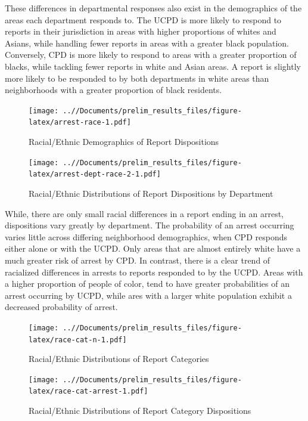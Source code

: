 \documentclass{ucetd}
\begin{document}
These differences in departmental responses also exist in the
demographics of the areas each department responds to. The UCPD is more
likely to respond to reports in their jurisdiction in areas with higher
proportions of whites and Asians, while handling fewer reports in areas
with a greater black population. Conversely, CPD is more likely to
respond to areas with a greater proportion of blacks, while tackling
fewer reports in white and Asian areas. A report is slightly more likely
to be responded to by both departments in white areas than neighborhoods
with a greater proportion of black residents.

\begin{figure}
\centering
\texttt{[image: ..//Documents/prelim\_results\_files/figure-latex/arrest-race-1.pdf]}
\caption{Racial/Ethnic Demographics of Report Dispositions}
\end{figure}

\begin{figure}
\centering
\texttt{[image: ..//Documents/prelim\_results\_files/figure-latex/arrest-dept-race-2-1.pdf]}
\caption{Racial/Ethnic Distributions of Report Dispositions by
Department}
\end{figure}

While, there are only small racial differences in a report ending in an
arrest, dispositions vary greatly by department. The probability of an
arrest occurring varies little across differing neighborhood
demographics, when CPD responds either alone or with the UCPD. Only
areas that are almost entirely white have a much greater risk of arrest
by CPD. In contrast, there is a clear trend of racialized differences in
arrests to reports responded to by the UCPD. Areas with a higher
proportion of people of color, tend to have greater probabilities of an
arrest occurring by UCPD, while ares with a larger white population
exhibit a decreased probability of arrest.

\begin{figure}
\centering
\texttt{[image: ..//Documents/prelim\_results\_files/figure-latex/race-cat-n-1.pdf]}
\caption{Racial/Ethnic Distributions of Report Categories}
\end{figure}

\begin{figure}
\centering
\texttt{[image: ..//Documents/prelim\_results\_files/figure-latex/race-cat-arrest-1.pdf]}
\caption{Racial/Ethnic Distributions of Report Category Dispositions}
\end{figure}
\end{document}
